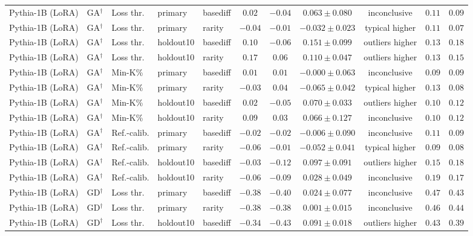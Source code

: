 {\begin{longtable}{@{\extracolsep{\fill}}lllllcccccc@{}}
Pythia-1B (LoRA) & GA$^{\dagger}$ & Loss thr. & primary & basediff & $0.02$ & $-0.04$ & $0.063 \pm 0.080$ & inconclusive & $0.11$ & $0.09$ \\
Pythia-1B (LoRA) & GA$^{\dagger}$ & Loss thr. & primary & rarity & $-0.04$ & $-0.01$ & $-0.032 \pm 0.023$ & typical higher & $0.11$ & $0.07$ \\
Pythia-1B (LoRA) & GA$^{\dagger}$ & Loss thr. & holdout10 & basediff & $0.10$ & $-0.06$ & $0.151 \pm 0.099$ & outliers higher & $0.13$ & $0.18$ \\
Pythia-1B (LoRA) & GA$^{\dagger}$ & Loss thr. & holdout10 & rarity & $0.17$ & $0.06$ & $0.110 \pm 0.047$ & outliers higher & $0.13$ & $0.15$ \\
Pythia-1B (LoRA) & GA$^{\dagger}$ & Min-K\% & primary & basediff & $0.01$ & $0.01$ & $-0.000 \pm 0.063$ & inconclusive & $0.09$ & $0.09$ \\
Pythia-1B (LoRA) & GA$^{\dagger}$ & Min-K\% & primary & rarity & $-0.03$ & $0.04$ & $-0.065 \pm 0.042$ & typical higher & $0.13$ & $0.08$ \\
Pythia-1B (LoRA) & GA$^{\dagger}$ & Min-K\% & holdout10 & basediff & $0.02$ & $-0.05$ & $0.070 \pm 0.033$ & outliers higher & $0.10$ & $0.12$ \\
Pythia-1B (LoRA) & GA$^{\dagger}$ & Min-K\% & holdout10 & rarity & $0.09$ & $0.03$ & $0.066 \pm 0.127$ & inconclusive & $0.10$ & $0.12$ \\
Pythia-1B (LoRA) & GA$^{\dagger}$ & Ref.-calib. & primary & basediff & $-0.02$ & $-0.02$ & $-0.006 \pm 0.090$ & inconclusive & $0.11$ & $0.09$ \\
Pythia-1B (LoRA) & GA$^{\dagger}$ & Ref.-calib. & primary & rarity & $-0.06$ & $-0.01$ & $-0.052 \pm 0.041$ & typical higher & $0.09$ & $0.08$ \\
Pythia-1B (LoRA) & GA$^{\dagger}$ & Ref.-calib. & holdout10 & basediff & $-0.03$ & $-0.12$ & $0.097 \pm 0.091$ & outliers higher & $0.15$ & $0.18$ \\
Pythia-1B (LoRA) & GA$^{\dagger}$ & Ref.-calib. & holdout10 & rarity & $-0.06$ & $-0.09$ & $0.028 \pm 0.049$ & inconclusive & $0.19$ & $0.17$ \\
Pythia-1B (LoRA) & GD$^{\dagger}$ & Loss thr. & primary & basediff & $-0.38$ & $-0.40$ & $0.024 \pm 0.077$ & inconclusive & $0.47$ & $0.43$ \\
Pythia-1B (LoRA) & GD$^{\dagger}$ & Loss thr. & primary & rarity & $-0.38$ & $-0.38$ & $0.001 \pm 0.015$ & inconclusive & $0.46$ & $0.44$ \\
Pythia-1B (LoRA) & GD$^{\dagger}$ & Loss thr. & holdout10 & basediff & $-0.34$ & $-0.43$ & $0.091 \pm 0.018$ & outliers higher & $0.43$ & $0.39$ \\

\end{longtable}}
